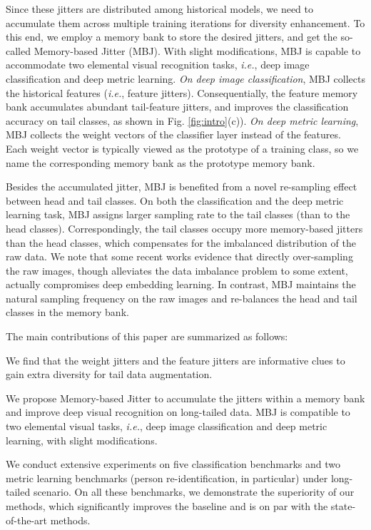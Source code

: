 \documentclass[final]{cvpr}
\def\ie{\textit{i.e.}}
\begin{document}
Since these jitters are distributed among historical models, we need to accumulate them across multiple training iterations for diversity enhancement. To this end, we employ a memory bank to store the desired jitters, and get the so-called Memory-based Jitter (MBJ). With slight modifications, MBJ is capable to accommodate two elemental visual recognition tasks, \ie, deep image classification and deep metric learning. \emph{On deep image classification}, MBJ collects the historical features (\ie, feature jitters). Consequentially, the feature memory bank accumulates abundant tail-feature jitters, and improves the classification accuracy on tail classes, as shown in Fig. \ref {fig:intro}{(c)}). \emph{On deep metric learning}, MBJ collects the weight vectors of the classifier layer instead of the features. Each weight vector is typically viewed as the prototype of a training class, so we name the corresponding memory bank as the prototype memory bank.  

Besides the accumulated jitter, MBJ is benefited from a novel re-sampling effect between head and tail classes. On both the classification and the deep metric learning task, MBJ assigns larger sampling rate to the tail classes (than to the head classes). Correspondingly, the tail classes occupy more memory-based jitters than the head classes, which compensates for the imbalanced distribution of the raw data. We note that some recent works \cite{BBN,decoupling} evidence that directly over-sampling the raw images, though alleviates the data imbalance problem to some extent, actually compromises deep embedding learning. In contrast, MBJ maintains the natural sampling frequency on the raw images and re-balances the head and tail classes in the memory bank. 

The main contributions of this paper are summarized as follows:

 We find that the weight jitters and the feature jitters are informative clues to gain extra diversity for tail data augmentation.

 We propose Memory-based Jitter to accumulate the jitters within a memory bank and improve deep visual recognition on long-tailed data. MBJ is compatible to two elemental visual tasks, \emph{i.e.}, deep image classification and deep metric learning, with slight modifications. 

 We conduct extensive experiments on five classification benchmarks and two metric learning benchmarks (person re-identification, in particular) under long-tailed scenario. On all these benchmarks, we demonstrate the superiority of our methods, which significantly improves the baseline and is on par with the state-of-the-art methods.
\end{document}

